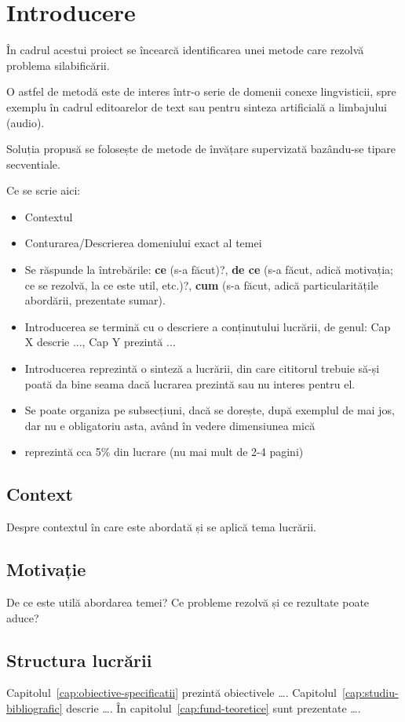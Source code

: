 \chapter{Introducere}
\label{cap:Introducere}
În cadrul acestui proiect se încearcă identificarea unei metode care rezolvă problema silabificării. 

O astfel de metodă este de interes într-o serie de domenii conexe lingvisticii, spre exemplu în cadrul editoarelor de text sau pentru sinteza artificială a limbajului (audio).

Soluția propusă se folosește de metode de învățare supervizată bazându-se tipare secventiale. 

Ce se scrie aici:
\begin{itemize}
    \item Contextul
    \item Conturarea/Descrierea domeniului exact al temei
    \item Se răspunde la întrebările: \textbf{ce} (s-a făcut)?, \textbf{de ce} (s-a făcut, adică motivația; ce se rezolvă, la ce este util, etc.)?, \textbf{cum} (s-a făcut, adică particularitățile abordării, prezentate sumar).
    \item Introducerea se termină cu o descriere a conținutului lucrării, de genul: Cap X descrie ..., Cap Y prezintă ...
    \item Introducerea reprezintă o sinteză a lucrării, din care cititorul trebuie să-și poată da bine seama dacă lucrarea prezintă sau nu interes pentru el. 
    \item Se poate organiza pe subsecțiuni, dacă se dorește, după exemplul de mai jos, dar nu e obligatoriu asta, având în vedere dimensiunea mică
    \item reprezintă cca 5\% din lucrare (nu mai mult de 2-4 pagini)
\end{itemize}

\section{Context}

Despre contextul în care este abordată și se aplică tema lucrării.

\section{Motivație}
De ce este utilă abordarea temei? Ce probleme rezolvă și ce rezultate poate aduce?

\section{Structura lucrării}
Capitolul~\ref{cap:obiective-specificatii} prezintă obiectivele \dots. Capitolul~\ref{cap:studiu-bibliografic} descrie \dots. În capitolul~\ref{cap:fund-teoretice} sunt prezentate \dots.
